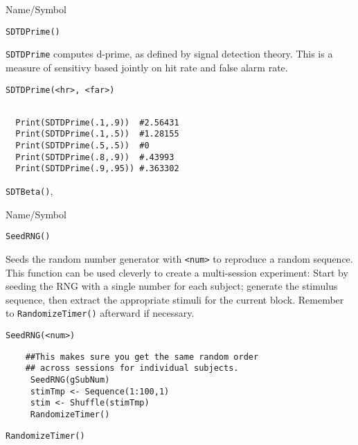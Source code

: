 \begin{desc}{Name/Symbol}
\item[Name/Symbol] 	\verb+SDTDPrime()+

\item[Description] \verb+SDTDPrime+ computes d-prime, as defined by
signal detection theory.  This is a measure of sensitivy based jointly
on hit rate and false alarm rate.

\item[Usage]        	
\begin{verbatim}
SDTDPrime(<hr>, <far>)
\end{verbatim}

\item[Example] 	
\begin{verbatim}

  Print(SDTDPrime(.1,.9))  #2.56431
  Print(SDTDPrime(.1,.5))  #1.28155
  Print(SDTDPrime(.5,.5))  #0
  Print(SDTDPrime(.8,.9))  #.43993
  Print(SDTDPrime(.9,.95)) #.363302

\end{verbatim}

\item[See Also]\verb+SDTBeta()+,
\end{desc}

\rl




\begin{desc}{Name/Symbol}
\item[Name/Symbol]   \verb+SeedRNG()+

\item[Description] Seeds the random number generator with \verb+<num>+
  to reproduce a random sequence.  This function can be used cleverly
  to create a multi-session experiment: Start by seeding the RNG with
  a single number for each subject; generate the stimulus sequence,
  then extract the appropriate stimuli for the current block. Remember
  to \verb+RandomizeTimer()+ afterward if necessary.

\item[Usage] 
\begin{verbatim}
SeedRNG(<num>) 
\end{verbatim}

\item[Example]	

\begin{verbatim}
    ##This makes sure you get the same random order 
    ## across sessions for individual subjects.
     SeedRNG(gSubNum)
     stimTmp <- Sequence(1:100,1)
     stim <- Shuffle(stimTmp)
     RandomizeTimer()
\end{verbatim}

\item[See Also]	
     \verb+RandomizeTimer()+
\end{desc}

